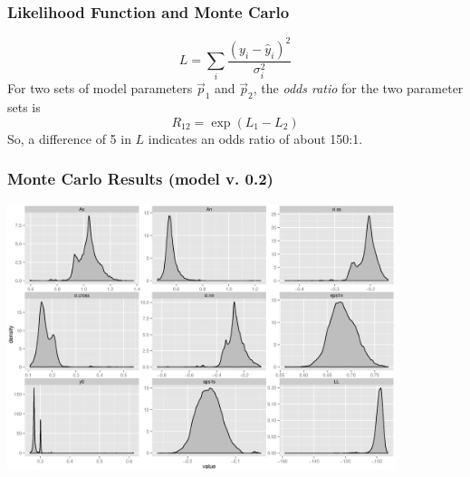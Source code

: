 \documentclass{beamer}
\begin{document}
\begin{frame}
  \frametitle{Likelihood Function and Monte Carlo}
  \begin{equation}
    L = \sum_i \frac{(y_i - \hat{y}_i)^2}{\sigma_i^2}
  \end{equation}
  For two sets of model parameters $\vec{p}_1$ and $\vec{p}_2$, the
  \emph{odds ratio} for the two parameter sets is
  \begin{equation}
    R_{12} = \exp\left(L_1 - L_2\right)
  \end{equation}
  So, a difference of 5 in $L$ indicates an odds ratio of about 150:1.
\end{frame}

\begin{frame}
  \frametitle{Monte Carlo Results (model v. 0.2)}
  \begin{center}
    \includegraphics[width=0.85\textwidth]{fig/mcrslt-v0_2-allrgn.eps}
  \end{center}
\end{frame}
\end{document}
